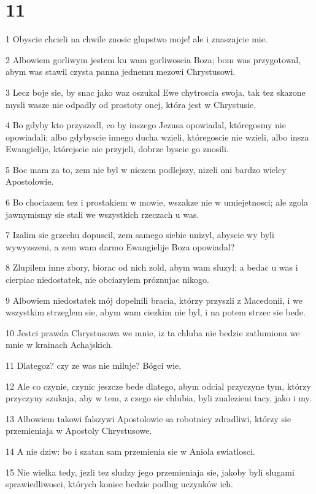 \chapter{11}

\par 1 Obyscie chcieli na chwile znosic glupstwo moje! ale i znaszajcie mie.
\par 2 Albowiem gorliwym jestem ku wam gorliwoscia Boza; bom was przygotowal, abym was stawil czysta panna jednemu mezowi Chrystusowi.
\par 3 Lecz boje sie, by snac jako waz oszukal Ewe chytroscia swoja, tak tez skazone mysli wasze nie odpadly od prostoty onej, która jest w Chrystusie.
\par 4 Bo gdyby kto przyszedl, co by inszego Jezusa opowiadal, któregosmy nie opowiadali; albo gdybyscie innego ducha wzieli, któregoscie nie wzieli, albo insza Ewangielije, którejscie nie przyjeli, dobrze byscie go znosili.
\par 5 Boc mam za to, zem nie byl w niczem podlejszy, nizeli oni bardzo wielcy Apostolowie.
\par 6 Bo chociazem tez i prostakiem w mowie, wszakze nie w umiejetnosci; ale zgola jawnymismy sie stali we wszystkich rzeczach u was.
\par 7 Izalim sie grzechu dopuscil, zem samego siebie unizyl, abyscie wy byli wywyzszeni, a zem wam darmo Ewangielije Boza opowiadal?
\par 8 Zlupilem inne zbory, biorac od nich zold, abym wam sluzyl; a bedac u was i cierpiac niedostatek, nie obciazylem próznujac nikogo.
\par 9 Albowiem niedostatek mój dopelnili bracia, którzy przyszli z Macedonii, i we wszystkim strzeglem sie, abym wam ciezkim nie byl, i na potem strzec sie bede.
\par 10 Jestci prawda Chrystusowa we mnie, iz ta chluba nie bedzie zatlumiona we mnie w krainach Achajskich.
\par 11 Dlategoz? czy ze was nie miluje? Bógci wie,
\par 12 Ale co czynie, czynic jeszcze bede dlatego, abym odcial przyczyne tym, którzy przyczyny szukaja, aby w tem, z czego sie chlubia, byli znalezieni tacy, jako i my.
\par 13 Albowiem takowi falszywi Apostolowie sa robotnicy zdradliwi, którzy sie przemieniaja w Apostoly Chrystusowe.
\par 14 A nie dziw: bo i szatan sam przemienia sie w Aniola swiatlosci.
\par 15 Nie wielka tedy, jezli tez sludzy jego przemieniaja sie, jakoby byli slugami sprawiedliwosci, których koniec bedzie podlug uczynków ich.
